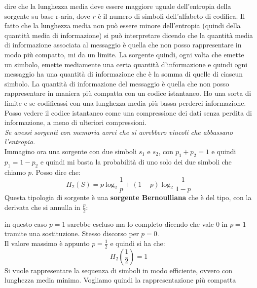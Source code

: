 \documentclass[a4paper,12pt, oneside]{book}
\begin{document}
dire che la lunghezza media deve essere maggiore uguale dell'entropia della
sorgente su base r-aria, dove $r$ è il numero di simboli dell'alfabeto di
codifica. Il fatto che la lunghezza media non può essere minore dell'entropia
(quindi della quantità media di informazione)
si può interpretare dicendo che la quantità media di informazione associata al
messaggio è quella che non posso rappresentare in modo più compatto, mi da un
limite. La sorgente quindi, ogni volta che emette un simbolo, emette mediamente
una certa quantità d'informazione e quindi ogni messaggio ha una quantità di
informazione che è la somma di quelle di ciascun simbolo. La quantità di
informazione del messaggio è quella che non posso rappresentare in maniera più
compatta con un codice istantaneo. Ho una sorta di limite e se codificassi con
una lunghezza media più bassa perderei informazione. Posso vedere il codice
istantaneo come una compressione dei dati senza perdita di informazione, a meno
di ulteriori compressioni.\\
\textit{Se avessi sorgenti con memoria avrei che si avrebbero vincoli che
  abbassano l'entropia.} \\
Immagino ora una sorgente con due simboli $s_1$ e $s_2$, con $p_1+p_2=1$ e
quindi $p_1=1-p_2$ e quindi mi basta la probabilità di uno solo dei due simboli
che chiamo $p$. Posso dire che:
\[H_2(S)=p\log_2\frac{1}{p}+(1-p)\log_2\frac{1}{1-p}\]
Questa tipologia di sorgente è una \textbf{sorgente Bernoulliana} che è del
tipo, con la derivata che si annulla in $\frac{p}{2}$:
\begin{figure}[H]
  \centering
  \label{fig:ber}
\end{figure}
in questo caso $p=1$ sarebbe escluso ma lo completo dicendo che vale 0 in $p=1$
tramite una sostituzione. Stesso discorso per $p=0$. \\
Il valore massimo è appunto $p=\frac{1}{2}$ e quindi si ha che:
\[H_2\left(\frac{1}{2}\right)=1\]
Si vuole rappresentare la sequenza di simboli in modo efficiente, ovvero con
lunghezza media minima. Vogliamo quindi la rappresentazione più compatta
\end{document}
